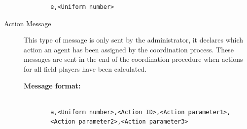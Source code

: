 \begin{description}
\begin{description}
\begin{verbatim}
  e,<Uniform number>
  \end{verbatim}
\end{description}
\item[Action Message]
This type of message is only sent by the administrator, it declares which action an agent has been assigned by the coordination process. These messages are sent in the end of the coordination procedure when actions for all field players have been calculated.
\begin{description}
  \item[{\bf Message format:}]
  \begin{verbatim}
  
  a,<Uniform number>,<Action ID>,<Action parameter1>,
  <Action parameter2>,<Action parameter3>
  \end{verbatim}
\end{description}

\end{description}

